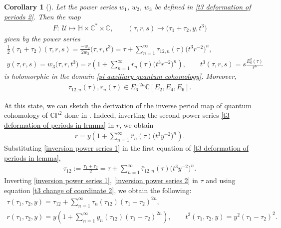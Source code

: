 \documentclass[pdftex]{sigma}
\numberwithin{equation}{section}
\newtheorem{Corollary}[Theorem]{Corollary}
\begin{document}
\begin{Corollary}[{\cite{Milanov}}]\label{lemma Milanov deformation corollary}
Let the power series $w_1$, $w_2$, $w_3$ be defined in \eqref{t3 deformation of periods 2}. Then the map
\begin{gather}\label{change of coordinate tau,r,s to tau1,tau2,t3}
 F\colon\ \mathcal{U}\mapsto \mathbb{H}\times \mathbb{C}^{*}\times \mathbb{C}, \qquad (\tau,r,s)\mapsto \bigl(\tau_1+\tau_2,y, t^3\bigr)
 \end{gather}
given by the power series
\begin{gather}
\frac{1}{2}(\tau_1+\tau_2)(\tau,r,s)=\frac{-w_2}{2w_3}\bigl(\tau,r,t^3\bigr)=\tau+\sum_{n=1}^{\infty} \tau_{12,n}(\tau) \bigl(t^3r^{-2}\bigr)^n ,\nonumber\\
y(\tau,r,s)=w_3\bigl(\tau,r,t^3\bigr)=r\left( 1+\sum_{n=1}^{\infty} r_n(\tau)\bigl(t^3r^{-2}\bigr)^n \right),\qquad
t^3(\tau,r,s)=s\frac{E_6^2(\tau)}{r^6}\label{t3 deformation of periods in lemma}
\end{gather}
 is holomorphic in the domain \eqref{pi auxiliary quantum cohomology}.
 Moreover,
\begin{gather}\label{coefficients of tau12 inside corollary Milanov}
 \tau_{12,n}(\tau) ,r_n(\tau) \in E_6^{-2n}\mathbb{C}[ E_2,E_4,E_6] .
\end{gather}
\end{Corollary}

At this state, we can sketch the derivation of the inverse period map of quantum cohomology of $\mathbb{CP}^2$ done in \cite[Section 5.4]{Milanov}. Indeed, inverting the second power series \eqref{t3 deformation of periods in lemma} in $r$, we obtain
\begin{gather}
r=y\left( 1+\sum_{n=1}^{\infty} \hat r_n(\tau)\bigl(t^3y^{-2}\bigr)^n \right).\label{inversion power series 1}
\end{gather}
Substituting \eqref{inversion power series 1} in the first equation of \eqref{t3 deformation of periods in lemma},
\begin{gather}\label{inversion power series 2}
\tau_{12}:=\frac{\tau_1+\tau_2}{2}=\tau+\sum_{n=1}^{\infty} \hat\tau_{12,n}(\tau) \bigl(t^3y^{-2}\bigr)^n .
\end{gather}
Inverting \eqref{inversion power series 1}, \eqref{inversion power series 2} in $\tau$ and using equation \eqref{t3 change of coordinate 2}, we obtain the following:
\begin{gather}
\tau(\tau_1,\tau_2,y)=\tau_{12}+\sum_{n=1}^{\infty} \tau_{n}(\tau_{12}) (\tau_1-\tau_2)^{2n} ,\nonumber\\
r(\tau_1,\tau_2,y)=y\left( 1+\sum_{n=1}^{\infty} y_n(\tau_{12})(\tau_1-\tau_2)^{2n} \right),\qquad
t^3(\tau_1,\tau_2,y)=y^2(\tau_1-\tau_2)^2.\label{t3 deformation of periods to compose}
\end{gather}
\end{document}
